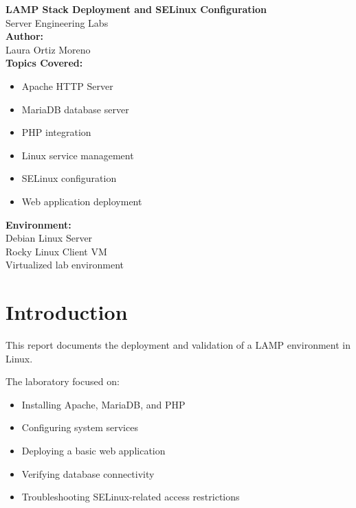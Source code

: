 \documentclass[11pt,a4paper]{article}
\begin{document}
\begin{titlepage}
    \centering

    \vspace*{3cm}

    {\Huge \textbf{LAMP Stack Deployment and SELinux Configuration}}\\[1cm]

    {\Large Server Engineering Labs}\\[2cm]

    \textbf{Author:}\\
    Laura Ortiz Moreno\\[1cm]

    \textbf{Topics Covered:}
    \begin{itemize}[leftmargin=4cm]
        \item Apache HTTP Server
        \item MariaDB database server
        \item PHP integration
        \item Linux service management
        \item SELinux configuration
        \item Web application deployment
    \end{itemize}

    \vfill

    \textbf{Environment:}\\
    Debian Linux Server\\
    Rocky Linux Client VM\\
    Virtualized lab environment

    \vspace{1cm}

\end{titlepage}

\tableofcontents
\newpage

\section{Introduction}

This report documents the deployment and validation of a LAMP environment in Linux.

The laboratory focused on:
\begin{itemize}
    \item Installing Apache, MariaDB, and PHP
    \item Configuring system services
    \item Deploying a basic web application
    \item Verifying database connectivity
    \item Troubleshooting SELinux-related access restrictions
\end{itemize}
\end{document}
